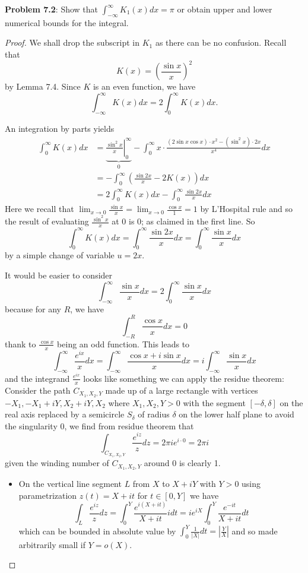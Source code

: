 \documentclass[12pt]{article}
\begin{document}
\fi

\textbf{Problem 7.2}: Show that $\int_{-\infty}^{\infty} K_1(x) dx = \pi$ or obtain upper and lower numerical bounds for the integral.

\begin{proof}
We shall drop the subscript in $K_1$ as there can be no confusion. Recall that
$$K(x) = \left(\frac{\sin x}{x}\right)^2$$
by Lemma 7.4. Since $K$ is an even function, we have %
$$\int_{-\infty}^{\infty} K(x) dx = 2 \int_0^{\infty} K(x) dx.$$

An integration by parts yields
\begin{align*}
\int_0^{\infty} K(x) dx &= \underbrace{\left. \frac{\sin^2 x}{x} \right|_0^{\infty}}_{0} - \int_0^{\infty} x \cdot \frac{(2 \sin x \cos x) \cdot x^2 - (\sin^2 x) \cdot 2 x}{x^4} dx \\
&= - \int_0^{\infty} \left( \frac{\sin 2x}{x} - 2 K(x) \right) dx \\
&= 2 \int_0^{\infty} K(x) dx - \int_0^{\infty} \frac{\sin 2x}{x} dx 
\end{align*}
Here we recall that $\lim_{x \rightarrow 0} \frac{\sin x}{x} = \lim_{x \rightarrow 0} \frac{\cos x}{1} = 1$ by L'Hospital rule and so the result of evaluating $\frac{\sin^2 x}{x}$ at 0 is 0; as claimed in the first line. So
$$\int_0^{\infty} K(x) dx = \int_0^{\infty} \frac{\sin 2x}{x} dx = \int_0^{\infty} \frac{\sin x}{x} dx$$
by a simple change of variable $u = 2x$.

It would be easier to consider
$$\int_{-\infty}^{\infty} \frac{\sin x}{x} dx = 2 \int_0^{\infty} \frac{\sin x}{x} dx$$
because for any $R$, we have
$$\int_{-R}^{R} \frac{\cos x}{x} dx = 0$$
thank to $\frac{\cos x}{x}$ being an odd function. This leads to
$$\int_{-\infty}^{\infty} \frac{e^{ix}}{x} dx = \int_{-\infty}^{\infty} \frac{\cos x + i \sin x}{x} dx = i \int_{-\infty}^{\infty} \frac{\sin x}{x} dx$$
and the integrand $\frac{e^{ix}}{x}$ looks like something we can apply the residue theorem: Consider the path $C_{X_1, X_2, Y}$ made up of a large rectangle with vertices $-X_1, -X_1 + iY, X_2 + iY, X_2$ where $X_1, X_2, Y > 0$ with the segment $[-\delta, \delta]$ on the real axis replaced by a semicircle $S_\delta$ of radius $\delta$ on the lower half plane to avoid the singularity $0$, we find from residue theorem that
$$\int_{C_{X_1, X_2, Y}} \frac{e^{iz}}{z} dz = 2 \pi i e^{i \cdot 0} = 2 \pi i$$
given the winding number of $C_{X_1, X_2, Y}$ around 0 is clearly 1.
\begin{itemize}
\item On the vertical line segment $L$ from $X$ to $X + iY$ with $Y > 0$ using parametrization $z(t) = X + it$ for $t \in [0, Y]$ we have
$$\int_{L} \frac{e^{iz}}{z} dz = \int_0^Y \frac{e^{i(X + it)}}{X + it} i dt = i e^{iX} \int_0^Y \frac{e^{-it}}{X + it} dt$$
which can be bounded in absolute value by $\int_0^Y \frac{1}{|X|} dt = |\frac{Y}{X}|$ and so made arbitrarily small if $Y = o(X)$.


\end{itemize}
\end{proof}
\end{document}
